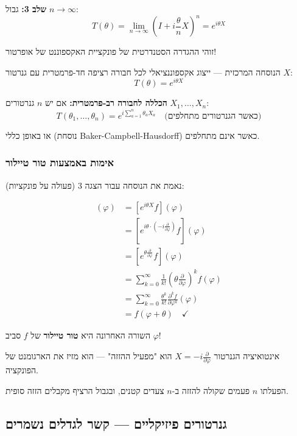 \textbf{שלב 3:} גבול $n \to \infty$:
\[
T(\theta) = \lim_{n\to\infty} \left(I + i\frac{\theta}{n} X\right)^n = \boxed{e^{i\theta X}}
\]

זוהי ההגדרה הסטנדרטית של פונקציית האקספוננט של אופרטור!


\begin{importantbox}{הנוסחה המרכזית — ייצוג אקספוננציאלי}
לכל חבורה רציפה חד-פרמטרית עם גנרטור $X$:
\[
\boxed{T(\theta) = e^{i\theta X}}
\]

\textbf{הכללה לחבורה רב-פרמטרית:} אם יש $n$ גנרטורים $X_1, \ldots, X_n$:
\[
T(\theta_1, \ldots, \theta_n) = e^{i\sum_{a=1}^{n} \theta_a X_a} \quad \text{(כאשר הגנרטורים מתחלפים)}
\]

או באופן כללי (נוסחת Baker-Campbell-Hausdorff) כאשר אינם מתחלפים.
\end{importantbox}

\subsubsection{אימות באמצעות טור טיילור}

נאמת את הנוסחה עבור הצגה 3 (פעולה על פונקציות):

\begin{align*}
[T(\theta) f](\varphi) &= \left[e^{i\theta X} f\right](\varphi) \\
&= \left[e^{i\theta \cdot (-i\frac{\partial}{\partial\varphi})} f\right](\varphi) \\
&= \left[e^{\theta \frac{\partial}{\partial\varphi}} f\right](\varphi) \\
&= \sum_{k=0}^{\infty} \frac{1}{k!} \left(\theta \frac{\partial}{\partial\varphi}\right)^k f(\varphi) \\
&= \sum_{k=0}^{\infty} \frac{\theta^k}{k!} \frac{\partial^k f}{\partial\varphi^k}(\varphi) \\
&= f(\varphi + \theta) \quad \checkmark
\end{align*}

השורה האחרונה היא \textbf{טור טיילור} של $f$ סביב $\varphi$!

\begin{notebox}{אינטואיציה}
הגנרטור $X = -i\frac{\partial}{\partial\varphi}$ הוא "מפעיל ההזזה" — הוא מזיז את הארגומנט של הפונקציה.

הפעלתו $n$ פעמים שקולה להזזה ב-$n$ צעדים קטנים, ובגבול הרציף מקבלים הזזה סופית.
\end{notebox}

\subsection{גנרטורים פיזיקליים — קשר לגדלים נשמרים}

